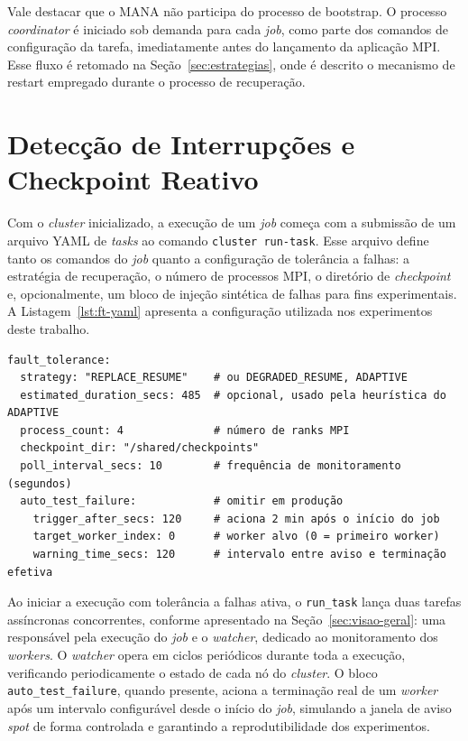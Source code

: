 Vale destacar que o MANA não participa do processo de bootstrap. O processo \textit{coordinator} é iniciado sob demanda para cada \textit{job}, como parte dos comandos de configuração da tarefa, imediatamente antes do lançamento da aplicação MPI. Esse fluxo é retomado na Seção~\ref{sec:estrategias}, onde é descrito o mecanismo de restart empregado durante o processo de recuperação.

\section{Detecção de Interrupções e Checkpoint Reativo}
\label{sec:watcher}

Com o \textit{cluster} inicializado, a execução de um \textit{job} começa com a submissão de um arquivo
YAML de \textit{tasks} ao comando \texttt{cluster run-task}. Esse arquivo define tanto os
comandos do \textit{job} quanto a configuração de tolerância a falhas: a estratégia de
recuperação, o número de processos MPI, o diretório de \textit{checkpoint} e,
opcionalmente, um bloco de injeção sintética de falhas para fins experimentais.
A Listagem~\ref{lst:ft-yaml} apresenta a configuração utilizada nos experimentos
deste trabalho.

\begin{listing}[htb]
  \caption{Configuração de tolerância a falhas com injeção sintética de interrupção \textit{spot}.}
  \label{lst:ft-yaml}
  \begin{verbatim}
fault_tolerance:
  strategy: "REPLACE_RESUME"    # ou DEGRADED_RESUME, ADAPTIVE
  estimated_duration_secs: 485  # opcional, usado pela heurística do ADAPTIVE
  process_count: 4              # número de ranks MPI
  checkpoint_dir: "/shared/checkpoints"
  poll_interval_secs: 10        # frequência de monitoramento (segundos)
  auto_test_failure:            # omitir em produção
    trigger_after_secs: 120     # aciona 2 min após o início do job
    target_worker_index: 0      # worker alvo (0 = primeiro worker)
    warning_time_secs: 120      # intervalo entre aviso e terminação efetiva
  \end{verbatim}
\end{listing}

Ao iniciar a execução com tolerância a falhas ativa, o \texttt{run\_task} lança duas
tarefas assíncronas concorrentes, conforme apresentado na Seção~\ref{sec:visao-geral}:
uma responsável pela execução do \textit{job} e o \textit{watcher}, dedicado ao monitoramento dos
\textit{workers}. O \textit{watcher} opera em ciclos periódicos durante toda a execução, verificando
periodicamente o estado de cada nó do \textit{cluster}. O bloco \texttt{auto\_test\_failure},
quando presente, aciona a terminação real de um \textit{worker} após um intervalo configurável
desde o início do \textit{job}, simulando a janela de aviso \textit{spot} de forma controlada e
garantindo a reprodutibilidade dos experimentos.

